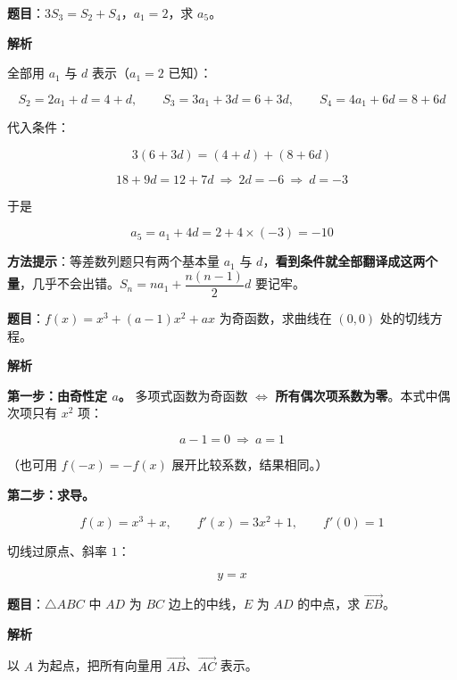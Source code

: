 \par\medskip


\textbf{题目}：$3S_3=S_2+S_4$，$a_1=2$，求 $a_5$。

\textbf{解析}

全部用 $a_1$ 与 $d$ 表示（$a_1=2$ 已知）：

\[S_2=2a_1+d=4+d,\qquad S_3=3a_1+3d=6+3d,\qquad S_4=4a_1+6d=8+6d\]

代入条件：

\[3(6+3d)=(4+d)+(8+6d)\]

\[18+9d=12+7d\ \Longrightarrow\ 2d=-6\ \Longrightarrow\ d=-3\]

于是

\[a_5=a_1+4d=2+4\times(-3)=-10\]


\begin{gktip}
\textbf{方法提示}：等差数列题只有两个基本量 $a_1$ 与 $d$，\textbf{看到条件就全部翻译成这两个量}，几乎不会出错。$S_n=na_1+\dfrac{n(n-1)}2d$ 要记牢。
\end{gktip}

\par\medskip


\textbf{题目}：$f(x)=x^{3}+(a-1)x^{2}+ax$ 为奇函数，求曲线在 $(0,0)$ 处的切线方程。

\textbf{解析}

\textbf{第一步：由奇性定 $a$。} 多项式函数为奇函数 $\iff$ \textbf{所有偶次项系数为零}。本式中偶次项只有 $x^{2}$ 项：

\[a-1=0\ \Longrightarrow\ a=1\]

（也可用 $f(-x)=-f(x)$ 展开比较系数，结果相同。）

\textbf{第二步：求导。}

\[f(x)=x^{3}+x,\qquad f'(x)=3x^{2}+1,\qquad f'(0)=1\]

切线过原点、斜率 $1$：

\[y=x\]


\par\medskip


\textbf{题目}：$\triangle ABC$ 中 $AD$ 为 $BC$ 边上的中线，$E$ 为 $AD$ 的中点，求 $\overrightarrow{EB}$。

\textbf{解析}

以 $A$ 为起点，把所有向量用 $\overrightarrow{AB}$、$\overrightarrow{AC}$ 表示。

